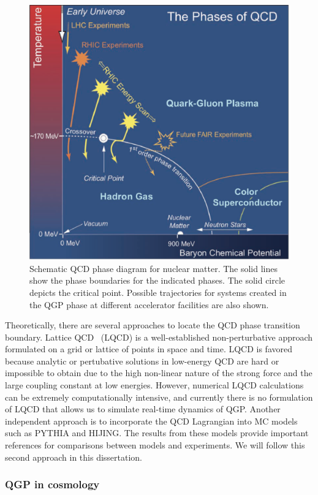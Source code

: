 \begin{figure}[H]
\centering
\includegraphics[width=.6\linewidth]{figs/chapter_intro/QCD_diagram.png}
\caption{Schematic QCD phase diagram for nuclear matter. The solid lines show the phase boundaries for the indicated phases. The solid circle depicts the critical point. Possible trajectories for systems created in the QGP phase at different accelerator facilities are also shown.}
\label{fig:intro_QCD_diagram}
\end{figure}

Theoretically, there are several approaches to locate the QCD phase transition boundary. Lattice QCD~\cite{Gupta:1997nd} (LQCD) is a well-established non-perturbative approach formulated on a grid or lattice of points in space and time. LQCD is favored because analytic or pertubative solutions in low-energy QCD are hard or impossible to obtain due to the high non-linear nature of the strong force and the large coupling constant at low energies. However, numerical LQCD calculations can be extremely computationally intensive, and currently there is no formulation of LQCD that allows us to simulate real-time dynamics of QGP. Another independent approach is to incorporate the QCD Lagrangian into MC models such as PYTHIA and HIJING. The results from these models provide important references for comparisons between models and experiments. We will follow this second approach in this dissertation.



\subsubsection{QGP in cosmology}

